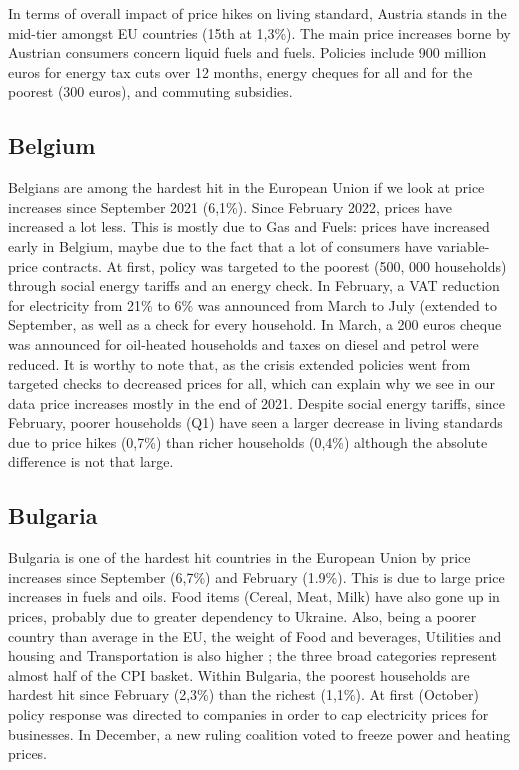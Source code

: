 \documentclass[
  9pt,
  a4paper,
  numbers=noendperiod,
  DIV=12]{scrartcl}
\begin{document}
In terms of overall impact of price hikes on living standard, Austria
stands in the mid-tier amongst EU countries (15th at 1,3\%). The main
price increases borne by Austrian consumers concern liquid fuels and
fuels. Policies include 900 million euros for energy tax cuts over 12
months, energy cheques for all and for the poorest (300 euros), and
commuting subsidies.

\hypertarget{belgium}{%
\subsection{Belgium}\label{belgium}}

Belgians are among the hardest hit in the European Union if we look at
price increases since September 2021 (6,1\%). Since February 2022,
prices have increased a lot less. This is mostly due to Gas and Fuels:
prices have increased early in Belgium, maybe due to the fact that a lot
of consumers have variable-price contracts. At first, policy was
targeted to the poorest (500, 000 households) through social energy
tariffs and an energy check. In February, a VAT reduction for
electricity from 21\% to 6\% was announced from March to July (extended
to September, as well as a check for every household. In March, a 200
euros cheque was announced for oil-heated households and taxes on diesel
and petrol were reduced. It is worthy to note that, as the crisis
extended policies went from targeted checks to decreased prices for all,
which can explain why we see in our data price increases mostly in the
end of 2021. Despite social energy tariffs, since February, poorer
households (Q1) have seen a larger decrease in living standards due to
price hikes (0,7\%) than richer households (0,4\%) although the absolute
difference is not that large.

\hypertarget{bulgaria}{%
\subsection{Bulgaria}\label{bulgaria}}

Bulgaria is one of the hardest hit countries in the European Union by
price increases since September (6,7\%) and February (1.9\%). This is
due to large price increases in fuels and oils. Food items (Cereal,
Meat, Milk) have also gone up in prices, probably due to greater
dependency to Ukraine. Also, being a poorer country than average in the
EU, the weight of Food and beverages, Utilities and housing and
Transportation is also higher ; the three broad categories represent
almost half of the CPI basket. Within Bulgaria, the poorest households
are hardest hit since February (2,3\%) than the richest (1,1\%). At
first (October) policy response was directed to companies in order to
cap electricity prices for businesses. In December, a new ruling
coalition voted to freeze power and heating prices.
\end{document}
